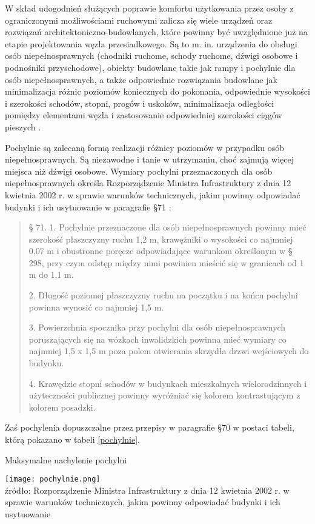 \documentclass[twoside,12pt]{article}
\begin{document}
	 W skład udogodnień służących poprawie komfortu użytkowania przez osoby z ograniczonymi możliwościami ruchowymi zalicza się wiele urządzeń oraz rozwiązań architektoniczno-budowlanych, które powinny być uwzględnione już na etapie projektowania węzła przesiadkowego. Są to m. in. urządzenia do obsługi osób niepełnosprawnych (chodniki ruchome, schody ruchome, dźwigi osobowe i podnośniki przyschodowe), obiekty budowlane takie jak rampy i pochylnie dla osób niepełnosprawnych, a także odpowiednie rozwiązania budowlane jak minimalizacja różnic poziomów koniecznych do pokonania, odpowiednie wysokości i szerokości schodów, stopni, progów i uskoków, minimalizacja odległości pomiędzy elementami węzła i zastosowanie odpowiedniej szerokości ciągów pieszych \cite{poznan}.
	 
	 Pochylnie są zalecaną formą realizacji różnicy poziomów w przypadku osób niepełnosprawnych. Są niezawodne i tanie w utrzymaniu, choć zajmują więcej miejsca niż dźwigi osobowe. Wymiary pochylni przeznaczonych dla osób niepełnosprawnych określa Rozporządzenie Ministra Infrastruktury z dnia 12 kwietnia 2002 r.	w sprawie warunków technicznych, jakim powinny odpowiadać budynki i ich usytuowanie w paragrafie §71 \cite{warunki_techniczne}:
	 \begin{quote}
	 § 71. 1. Pochylnie przeznaczone dla osób niepełnosprawnych powinny mieć szerokość płaszczyzny ruchu 1,2 m, krawężniki o wysokości co najmniej 0,07 m i obustronne poręcze odpowiadające warunkom określonym w § 298, przy czym odstęp między nimi powinien mieścić się w granicach od 1 m do 1,1 m.
	 
2. Długość poziomej płaszczyzny ruchu na początku i na końcu pochylni powinna wynosić co najmniej 1,5 m.

3. Powierzchnia spocznika przy pochylni dla osób niepełnosprawnych poruszających się na wózkach inwalidzkich powinna mieć wymiary co najmniej 1,5 x 1,5 m poza polem otwierania skrzydła drzwi wejściowych do budynku.

4. Krawędzie stopni schodów w budynkach mieszkalnych wielorodzinnych i użyteczności publicznej powinny wyróżniać się kolorem kontrastującym z kolorem posadzki.
	 \end{quote}
	 
	 Zaś pochylenia dopuszczalne przez przepisy  w paragrafie §70 w postaci tabeli, którą pokazano w tabeli \ref{pochylnie}.
	 	\begin{table}[H]
		\centering
		\caption{Maksymalne nachylenie pochylni}
		\texttt{[image: pochylnie.png]}\\
		\footnotesize{źródło: Rozporządzenie Ministra Infrastruktury z dnia 12 kwietnia 2002 r.	w sprawie warunków technicznych, jakim powinny odpowiadać budynki i ich usytuowanie \cite{warunki_techniczne}}
		\label{pochylnie}
	\end{table}
	
\end{document}
